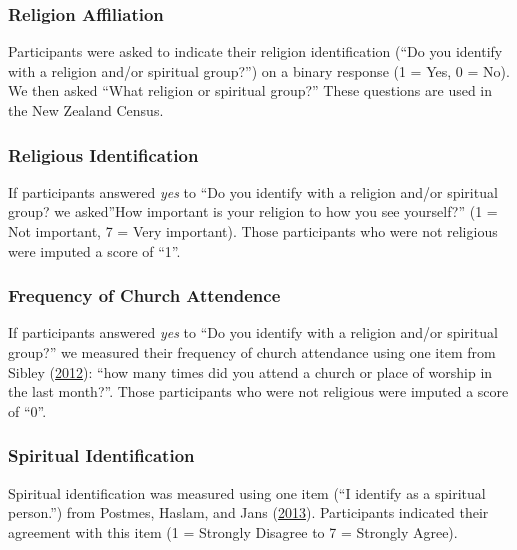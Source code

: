 \documentclass[
  singlecolumn]{report}
\begin{document}
\hypertarget{religion-affiliation}{%
\subsubsection{Religion Affiliation}\label{religion-affiliation}}

Participants were asked to indicate their religion identification (``Do
you identify with a religion and/or spiritual group?'') on a binary
response (1 = Yes, 0 = No). We then asked ``What religion or spiritual
group?'' These questions are used in the New Zealand Census.

\hypertarget{religious-identification}{%
\subsubsection{Religious
Identification}\label{religious-identification}}

If participants answered \emph{yes} to ``Do you identify with a religion
and/or spiritual group? we asked''How important is your religion to how
you see yourself?'' (1 = Not important, 7 = Very important). Those
participants who were not religious were imputed a score of ``1''.

\hypertarget{frequency-of-church-attendence}{%
\subsubsection{Frequency of Church
Attendence}\label{frequency-of-church-attendence}}

If participants answered \emph{yes} to ``Do you identify with a religion
and/or spiritual group?'' we measured their frequency of church
attendance using one item from Sibley
(\protect\hyperlink{ref-sibley2012}{2012}): ``how many times did you
attend a church or place of worship in the last month?''. Those
participants who were not religious were imputed a score of ``0''.

\hypertarget{spiritual-identification}{%
\subsubsection{Spiritual
Identification}\label{spiritual-identification}}

Spiritual identification was measured using one item (``I identify as a
spiritual person.'') from Postmes, Haslam, and Jans
(\protect\hyperlink{ref-postmes_single-item_2013}{2013}). Participants
indicated their agreement with this item (1 = Strongly Disagree to 7 =
Strongly Agree).
\end{document}
